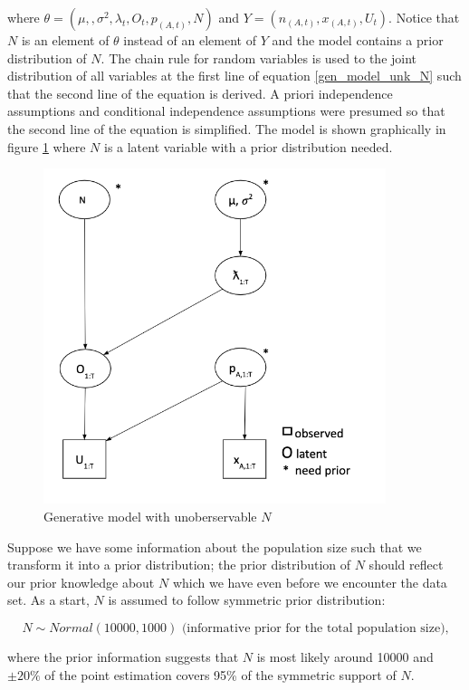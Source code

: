 \documentclass[12pt]{article}
\begin{document}
{where $\theta = (\mu, ,\sigma^2,\lambda_t, O_t, p_{(A,t)}, N)$ and $ Y = (n_{(A,t)}, x_{(A,t)}, U_t)$. Notice that $N$ is an element of $\theta$ instead of an element of $Y$ and the model contains a prior distribution of $N$. The chain rule for random variables \cite{chain_rule} is used to the joint distribution of all variables at the first line of equation \ref{gen_model_unk_N} such that the second line of the equation is derived.
A priori independence assumptions and conditional independence assumptions were presumed so that the second line of the equation is simplified. The model is shown graphically in figure \ref{draw_N} where $N$ is a latent variable with a prior distribution needed.\\

\begin{figure}[htb]
	\centering
	\includegraphics[width=100mm,scale=0.3]{Figures/draw_N}
	\caption{Generative model with unoberservable $N$}
	\label{draw_N}
\end{figure}

Suppose we have some information about the population size such that we transform it into a prior distribution; the prior distribution of $N$ should reflect our prior knowledge about $N$ which we have even before we encounter the data set. As a start,  $N$ is assumed to follow symmetric prior distribution: 

\begin{equation}
\label{in_prior_N}
N \sim Normal(10000,1000)
\text{ (informative prior for the total population size),}
\end{equation} 

where the prior information suggests that $N$ is most likely around 10000 and $\pm 20\%$ of the point estimation covers  95\% of the symmetric support of $N$.
}
\end{document}
